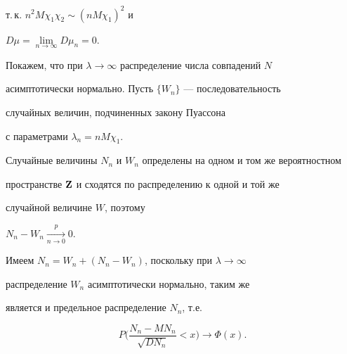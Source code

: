 т.\,к. $n^2M \chi_1 \chi_2 \sim {(n M \chi_1)}^2$ и 


$D\mu=\lim\limits_{n\to\infty} D\mu_n = 0.$





Покажем, что при $\lambda\to\infty$ распределение числа совпадений $N$


асимптотически нормально. Пусть $\{ W_n\}$ --- последовательность 


случайных величин, подчиненных закону Пуассона


с параметрами $\lambda_n=nM\chi_1$.


Случайные величины $N_n$ и $W_n$ определены на одном и том же вероятностном


пространстве $\bold Z$ и сходятся по распределению к одной и той же


случайной величине $W$, поэтому


$N_n-W_n \mathop{\rightarrow}\limits^p_{n \to 0}0.$


Имеем $N_n=W_n+(N_n-W_n)$, поскольку при $\lambda\to\infty$


распределение $W_n$ асимптотически нормально, таким же 


является и предельное распределение $N_n$, т.е.


$$


P\bigg(\frac{N_n-MN_n}{\sqrt{DN_n}}<x \bigg)\to \Phi(x).


$$





